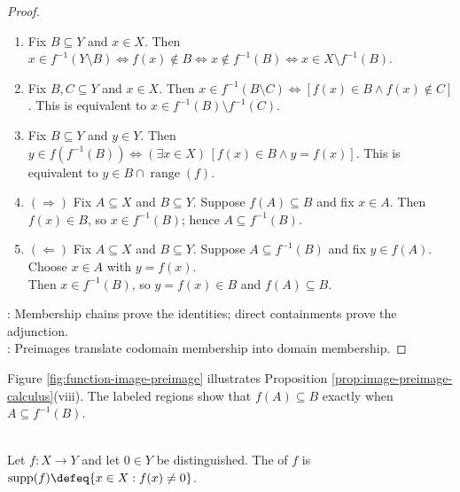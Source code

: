 \begin{proposition}
\begin{proof}
\begin{enumerate}[label=(\roman*)]
\item Fix $B\subseteq Y$ and $x\in X$. Then $x\in f^{-1}(Y\setminus B)\Longleftrightarrow f(x)\notin B\Longleftrightarrow x\notin f^{-1}(B)\Longleftrightarrow x\in X\setminus f^{-1}(B)$.
\item Fix $B,C\subseteq Y$ and $x\in X$. Then $x\in f^{-1}(B\setminus C)\Longleftrightarrow[f(x)\in B\land f(x)\notin C]$. This is equivalent to $x\in f^{-1}(B)\setminus f^{-1}(C)$.
\item Fix $B\subseteq Y$ and $y\in Y$. Then $y\in f(f^{-1}(B))\Longleftrightarrow(\exists x\in X)\,[f(x)\in B\land y=f(x)]$. This is equivalent to $y\in B\cap\operatorname{range}(f)$.
\item[$(viii)$]$(\Rightarrow)$ Fix $A\subseteq X$ and $B\subseteq Y$. Suppose $f(A)\subseteq B$ and fix $x\in A$. Then $f(x)\in B$, so $x\in f^{-1}(B)$; hence $A\subseteq f^{-1}(B)$. 
\item[$(viii)$]$(\Leftarrow)$ Fix $A\subseteq X$ and $B\subseteq Y$. Suppose $A\subseteq f^{-1}(B)$ and fix $y\in f(A)$. Choose $x\in A$ with $y=f(x)$.\\
Then $x\in f^{-1}(B)$, so $y=f(x)\in B$ and $f(A)\subseteq B$.
\end{enumerate}
: Membership chains prove the identities; direct containments prove the adjunction.\\
: Preimages translate codomain membership into domain membership.
\end{proof}
\end{proposition}

\begin{illustrationfigure}[H]
  \centering
  
  \caption{Image--preimage adjunction: $f(A)\subseteq B\Longleftrightarrow A\subseteq f^{-1}(B)$.}
  \label{fig:function-image-preimage}
\end{illustrationfigure}

Figure \ref{fig:function-image-preimage} illustrates Proposition \ref{prop:image-preimage-calculus}(viii). The labeled regions show that $f(A)\subseteq B$ exactly when $A\subseteq f^{-1}(B)$.

\begin{definition} \label{def:algebraic-support-of-function} \\
Let $f:X\to Y$ and let $0\in Y$ be distinguished. The  of $f$ is $\operatorname{supp}(f)\defeq\{x\in X:f(x)\neq0\}$.
\end{definition}
